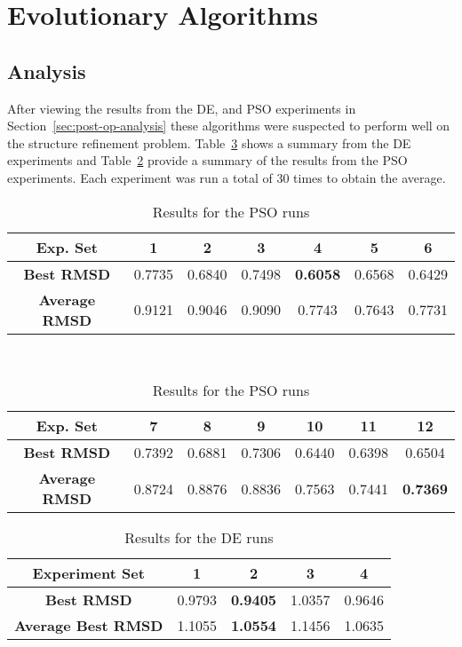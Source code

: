 \section{Evolutionary Algorithms}

\subsection{Analysis}

After viewing the results from the DE, and PSO experiments in Section~\ref{sec:post-op-analysis} these algorithms were suspected to perform well on the structure refinement problem. Table~\ref{table:ea-de-results} shows a summary from the DE experiments and Table~\ref{table:ea-pso-results} provide a summary of the results from the PSO experiments. Each experiment was run a total of 30 times to obtain the average.

\begin{table}
	\centering
	\begin{tabular}{ | >{\bfseries}c | c | c | c | c | c | c | }
		\hline
		Exp. Set & 1 & 2 & 3 & 4 & 5 & 6 \\ \hline
		Best RMSD & 0.7735 & 0.6840 & 0.7498 & \textbf{0.6058} & 0.6568 & 0.6429 \\ \hline
		Average RMSD & 0.9121 & 0.9046 & 0.9090 & 0.7743 & 0.7643 & 0.7731 \\ \hline
	\end{tabular}
	\\
	\vspace{3 mm}
	\begin{tabular}{ | >{\bfseries}c | c | c | c | c | c | c | }
		\hline
		Exp. Set & 7 & 8 & 9 & 10 & 11 & 12 \\ \hline
		Best RMSD & 0.7392 & 0.6881 & 0.7306 & 0.6440 & 0.6398 & 0.6504 \\ \hline
		Average RMSD & 0.8724 & 0.8876 & 0.8836 & 0.7563 & 0.7441 & \textbf{0.7369} \\ \hline
	\end{tabular}
	\caption{Results for the PSO runs}
	\label{table:ea-pso-results}
\end{table}

\begin{table}
	\centering
	\begin{tabular}{ | >{\bfseries}c | c | c | c | c | }
		\hline
		Experiment Set & 1 & 2 & 3 & 4 \\ \hline
		Best RMSD & 0.9793 & \textbf{0.9405} & 1.0357 & 0.9646 \\ \hline
		Average Best RMSD & 1.1055 & \textbf{1.0554} & 1.1456 & 1.0635 \\ \hline
	\end{tabular}
	\caption{Results for the DE runs}
	\label{table:ea-de-results}
\end{table}

